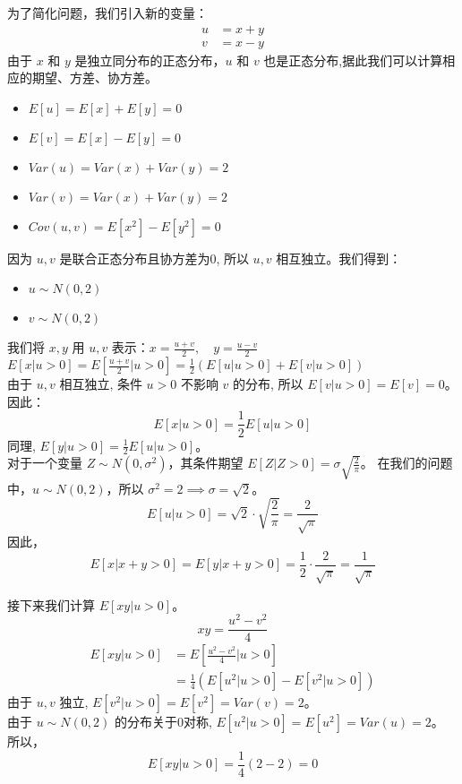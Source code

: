 \documentclass[UTF8]{ctexart}
\begin{document}
    为了简化问题，我们引入新的变量：
    \begin{align*}
    u &= x + y \\
    v &= x - y
    \end{align*}
    由于 $x$ 和 $y$ 是独立同分布的正态分布，$u$ 和 $v$ 也是正态分布,据此我们可以计算相应的期望、方差、协方差。
    \begin{itemize}
        \item $E[u] = E[x] + E[y]  = 0$
        \item $E[v] = E[x] - E[y] = 0$
        \item $Var(u) = Var(x) + Var(y) = 2$
        \item $Var(v)  = Var(x) + Var(y) = 2$
        \item $Cov(u, v)  = E[x^2] - E[y^2] = 0$
    \end{itemize}

    因为 $u, v$ 是联合正态分布且协方差为0, 所以 $u, v$ 相互独立。我们得到：
    \begin{itemize}
    \item $u \sim N(0, 2)$ 
    \item $v \sim N(0, 2)$
    \end{itemize}

    我们将 $x, y$ 用 $u, v$ 表示：$ x = \frac{u+v}{2}, \quad y = \frac{u-v}{2} $
    \\
    $E[x | u>0] = E\left[\frac{u+v}{2} \bigg| u>0\right] = \frac{1}{2} (E[u | u>0] + E[v | u>0])$ \\
    由于 $u, v$ 相互独立, 条件 $u>0$ 不影响 $v$ 的分布, 所以 $E[v | u>0] = E[v] = 0$。因此：
    \[ E[x | u>0] = \frac{1}{2} E[u | u>0] \]
    同理, $E[y | u>0] = \frac{1}{2} E[u | u>0]$。\\
    对于一个变量 $Z \sim N(0, \sigma^2)$，其条件期望 $E[Z | Z>0] = \sigma \sqrt{\frac{2}{\pi}}$。
    在我们的问题中，$u \sim N(0, 2)$，所以 $\sigma^2 = 2 \implies \sigma = \sqrt{2}$。
    \[ E[u | u>0] = \sqrt{2} \cdot \sqrt{\frac{2}{\pi}} = \frac{2}{\sqrt{\pi}} \]
    因此，
    \[ E[x | x+y>0] = E[y | x+y>0] = \frac{1}{2} \cdot \frac{2}{\sqrt{\pi}} = \frac{1}{\sqrt{\pi}} \]
    
    接下来我们计算 $E[xy | u>0]$。
    \[ xy = \frac{u^2 - v^2}{4} \]
    \begin{align*}
    E[xy | u>0] &= E\left[\frac{u^2 - v^2}{4} \bigg| u>0\right] \\
    &= \frac{1}{4} (E[u^2 | u>0] - E[v^2 | u>0])
    \end{align*}
    由于 $u,v$ 独立, $E[v^2|u>0] = E[v^2] = Var(v) = 2$。\\
    由于 $u \sim N(0,2)$ 的分布关于0对称, $E[u^2 | u>0] = E[u^2] = Var(u) = 2$。\\
    所以，
    \[ E[xy | u>0] = \frac{1}{4} (2 - 2) = 0 \]
\end{document}

